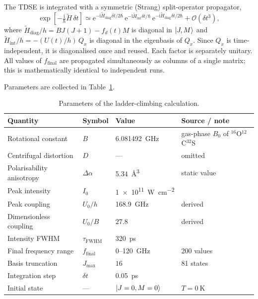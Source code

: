 The TDSE is integrated with a symmetric (Strang) split-operator propagator,
%
\begin{equation}
  \exp\!\left[-\tfrac{\mathrm{i}}{\hbar}\tilde H\,\delta t\right]
  \simeq
  \mathrm{e}^{-\mathrm{i}\tilde H_{\mathrm{diag}}\delta t/2\hbar}\,
  \mathrm{e}^{-\mathrm{i}\tilde H_{\mathrm{int}}\delta t/\hbar}\,
  \mathrm{e}^{-\mathrm{i}\tilde H_{\mathrm{diag}}\delta t/2\hbar}
  + \mathcal{O}(\delta t^{3}),
  \label{eq:app-strang}
\end{equation}
%
where $\tilde H_{\mathrm{diag}}/h = B J(J+1) - f_d(t)M$ is diagonal in
$\ket{J,M}$ and $\tilde H_{\mathrm{int}}/h = -(U(t)/h)\,Q_x$ is diagonal in the
eigenbasis of $Q_x$. Since $Q_x$ is time-independent, it is diagonalised once
and reused. Each factor is separately unitary. All values of
$f_{\mathrm{final}}$ are propagated simultaneously as columns of a single
matrix; this is mathematically identical to independent runs.

Parameters are collected in Table~\ref{tab:app-parameters}.

\begin{table}[htbp]
  \centering
  \caption{Parameters of the ladder-climbing calculation.}
  \label{tab:app-parameters}
  \begin{tabular}{llll}
    \toprule
    Quantity & Symbol & Value & Source / note \\
    \midrule
    Rotational constant & $B$ & \SI{6.081492}{\giga\hertz}
      & gas-phase $B_0$ of $^{16}$O$^{12}$C$^{32}$S \\
    Centrifugal distortion & $D$ & --- & omitted \\
    Polarisability anisotropy & $\Delta\alpha$ & \SI{5.34}{\cubic\angstrom}
      & static value \\
    Peak intensity & $I_0$ & \SI{1e11}{\watt\per\square\centi\meter} & \\
    Peak coupling & $U_0/h$ & \SI{168.9}{\giga\hertz} & derived \\
    Dimensionless coupling & $U_0/B$ & $27.8$ & derived \\
    Intensity FWHM & $\tau_{\mathrm{FWHM}}$ & \SI{320}{\pico\second} & \\
    Final frequency range & $f_{\mathrm{final}}$ & $0$--\SI{120}{\giga\hertz}
      & 200 values \\
    Basis truncation & $J_{\max}$ & $16$ & 81 states \\
    Integration step & $\delta t$ & \SI{0.05}{\pico\second} & \\
    Initial state & --- & $\ket{J=0,M=0}$ & $T=\SI{0}{\kelvin}$ \\
    \bottomrule
  \end{tabular}
\end{table}

